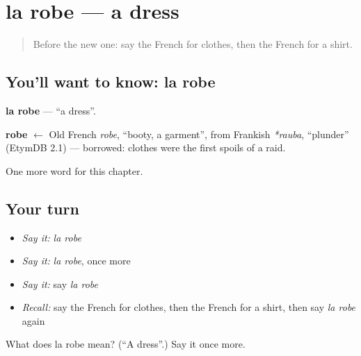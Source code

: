 \section[la robe]{la robe — a dress}

\label{lesson:FR-C103-robe}



\begin{quote}
Before the new one: say the French for clothes, then the French for a shirt.
\end{quote}

\subsection*{You'll want to know: la robe}
\textbf{la robe} — \textquotedblleft{}a dress\textquotedblright{}.

\begin{cousinweb}
\textbf{robe} $\leftarrow$ Old French \emph{robe}, \textquotedblleft{}booty, a garment\textquotedblright{}, from Frankish \emph{*rauba}, \textquotedblleft{}plunder\textquotedblright{} (EtymDB 2.1) — borrowed: clothes were the first spoils of a raid.
\end{cousinweb}

\begin{grammarlens}[title={What you've built}]
One more word for this chapter.
\end{grammarlens}

\subsection*{Your turn}
\begin{itemize}
\raggedright
  \item \emph{Say it:} \emph{la robe}
  \item \emph{Say it:} \emph{la robe}, once more
  \item \emph{Say it:} say \emph{la robe}
  \item \emph{Recall:} say the French for clothes, then the French for a shirt, then say \emph{la robe} again
\end{itemize}

\begin{tcolorbox}[breakable,colback=teal!4,colframe=teal!35!black,title={Before you move on}]
What does la robe mean? (\textquotedblleft{}A dress\textquotedblright{}.) Say it once more.
\end{tcolorbox}

